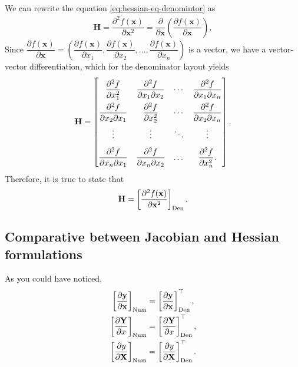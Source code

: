 \documentclass{article}
\newcommand{\trans}{\top}
\begin{document}
We can rewrite the equation \eqref{eq:hessian-eq-denomintor} as
\begin{align}
    \mathbf{H} = \dfrac{\partial^{2} f(\mathbf{x})}{\partial \mathbf{x}^2} = \dfrac{\partial }{\partial \mathbf{x}}\left( \dfrac{\partial f(\mathbf{x})}{\partial \mathbf{x}} \right),
\end{align}
Since \(\dfrac{\partial f(\mathbf{x})}{\partial \mathbf{x}} = \left( \dfrac{\partial f(\mathbf{x})}{\partial x_1}, \dfrac{\partial f(\mathbf{x})}{\partial x_2}, \dots, \dfrac{\partial f(\mathbf{x})}{\partial x_n} \right)\) is a vector, we have a vector-vector differentiation, which for the denominator layout yields
\begin{align}
    \mathbf{H} = \renewcommand{\arraystretch}{2.2}\begin{bmatrix}
        \dfrac{\partial^{2} f}{\partial x_1^2} & \dfrac{\partial^{2} f}{\partial x_1 \partial x_2} & \cdots & \dfrac{\partial^{2} f}{\partial x_1 \partial x_n} \\
        \dfrac{\partial^{2} f}{\partial x_2 \partial x_1} & \dfrac{\partial^{2} f}{\partial x_2^2} & \cdots & \dfrac{\partial^{2} f}{\partial x_2 \partial x_n} \\
        \vdots & \vdots & \ddots & \vdots \\
        \dfrac{\partial^{2} f}{\partial x_n \partial x_1} & \dfrac{\partial^{2} f}{\partial x_n \partial x_2} & \dots & \dfrac{\partial^{2} f}{\partial x_n^2}.
    \end{bmatrix}.
\end{align}
Therefore, it is true to state that
\begin{align}
    \mathbf{H} = \left[ \dfrac{\partial^{2} f(\mathbf{x})}{\partial \mathbf{x}^2} \right]_{\textnormal{Den}}.
\end{align}

\subsection{Comparative between Jacobian and Hessian formulations}

As you could have noticed,
\begin{align}
    \left[ \dfrac{\partial \mathbf{y}}{\partial \mathbf{x}} \right]_{\textnormal{Num}} & = \left[ \dfrac{\partial \mathbf{y}}{\partial \mathbf{x}} \right]_{\textnormal{Den}}^{\trans}, \\
    \left[ \dfrac{\partial \mathbf{Y}}{\partial x}\right]_{\textnormal{Num}} & = \left[ \dfrac{\partial \mathbf{Y}}{\partial x}\right]_{\textnormal{Den}}^{\trans}, \\
    \left[\dfrac{\partial y}{\partial \mathbf{X}}\right]_{\textnormal{Num}} & = \left[\dfrac{\partial y}{\partial \mathbf{X}}\right]_{\textnormal{Den}}^{\trans}.
\end{align}
\end{document}

